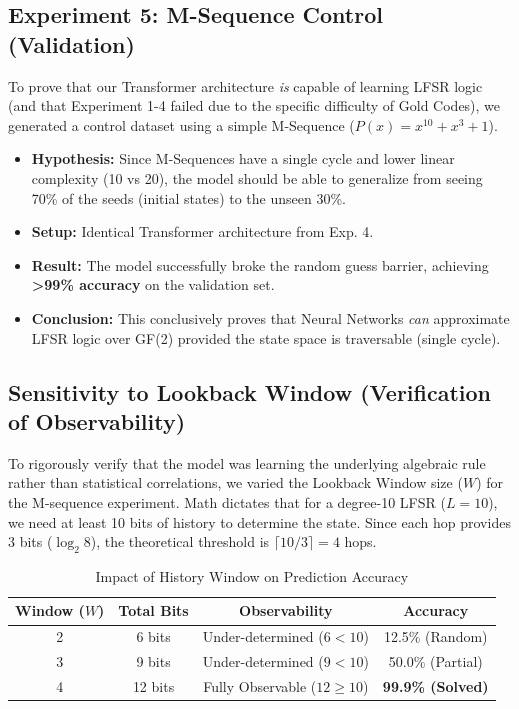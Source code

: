 \documentclass[12pt,a4paper]{report}
\theoremstyle{plain}
\begin{document}
\subsection{Experiment 5: M-Sequence Control (Validation)}
To prove that our Transformer architecture \textit{is} capable of learning LFSR logic (and that Experiment 1-4 failed due to the specific difficulty of Gold Codes), we generated a control dataset using a simple M-Sequence ($P(x) = x^{10} + x^3 + 1$).
\begin{itemize}
    \item \textbf{Hypothesis:} Since M-Sequences have a single cycle and lower linear complexity (10 vs 20), the model should be able to generalize from seeing 70\% of the seeds (initial states) to the unseen 30\%.
    \item \textbf{Setup:} Identical Transformer architecture from Exp. 4.
    \item \textbf{Result:} The model successfully broke the random guess barrier, achieving \textbf{>99\% accuracy} on the validation set.
    \item \textbf{Conclusion:} This conclusively proves that Neural Networks \textit{can} approximate LFSR logic over GF(2) provided the state space is traversable (single cycle).
\end{itemize}

\subsection{Sensitivity to Lookback Window (Verification of Observability)}
To rigorously verify that the model was learning the underlying algebraic rule rather than statistical correlations, we varied the Lookback Window size ($W$) for the M-sequence experiment.
Math dictates that for a degree-10 LFSR ($L=10$), we need at least 10 bits of history to determine the state. Since each hop provides 3 bits ($\log_2 8$), the theoretical threshold is $\lceil 10/3 \rceil = 4$ hops.

\begin{table}[H]
    \centering
    \caption{Impact of History Window on Prediction Accuracy}
    \begin{tabular}{cccc}
        \toprule
        \textbf{Window ($W$)} & \textbf{Total Bits} & \textbf{Observability} & \textbf{Accuracy} \\
        \midrule
        2 & 6 bits & Under-determined ($6 < 10$) & 12.5\% (Random) \\
        3 & 9 bits & Under-determined ($9 < 10$) & 50.0\% (Partial) \\
        4 & 12 bits & Fully Observable ($12 \ge 10$) & \textbf{99.9\% (Solved)} \\
        \bottomrule
    \end{tabular}
    \label{tab:window_sensitivity}
\end{table}
\end{document}
